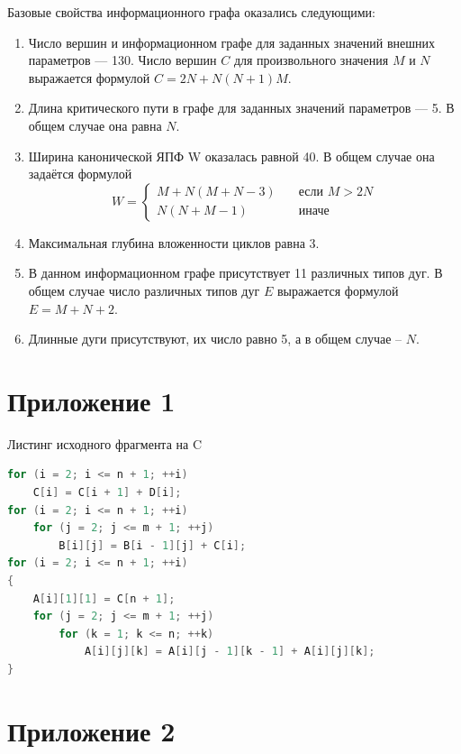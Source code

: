 \documentclass[oneside, final, 14pt]{extarticle}
\begin{document}
Базовые свойства информационного графа оказались следующими:

\begin{enumerate}
    \item Число вершин и информационном графе для заданных значений внешних параметров --- 130.
    Число вершин $ C $ для произвольного значения $ M  $ и $ N $ выражается формулой $ C = 2N + N(N + 1)M $.
    \item Длина критического пути в графе для заданных значений параметров --- 5. В общем случае она равна $ N $.
    \item Ширина канонической ЯПФ W оказалась равной 40. В общем случае она задаётся
    формулой
    $$
    W =
    \begin{cases}
      M + N(M + N - 3)       & \quad \text{если } M > 2N\\
      N(N + M - 1)  & \quad \text{иначе}
    \end{cases}
    $$
    \item Максимальная глубина вложенности циклов равна 3.
    \item В данном информационном графе присутствует 11 различных типов дуг. В общем случае число различных типов дуг $ E $ выражается
    формулой $ E =  M + N + 2 $.
    \item Длинные дуги присутствуют, их число равно 5, а в общем случае – $ N $.
\end{enumerate}

\section*{Приложение 1}

Листинг исходного фрагмента на C

\begin{minipage}{0.9\linewidth}
\begin{lstlisting}[language=C, style=CStyle]
for (i = 2; i <= n + 1; ++i)
    C[i] = C[i + 1] + D[i];
for (i = 2; i <= n + 1; ++i)
    for (j = 2; j <= m + 1; ++j)
        B[i][j] = B[i - 1][j] + C[i];
for (i = 2; i <= n + 1; ++i)
{
    A[i][1][1] = C[n + 1];
    for (j = 2; j <= m + 1; ++j)
        for (k = 1; k <= n; ++k)
            A[i][j][k] = A[i][j - 1][k - 1] + A[i][j][k];
}
\end{lstlisting}
\end{minipage}

\section*{Приложение 2}
\end{document}
